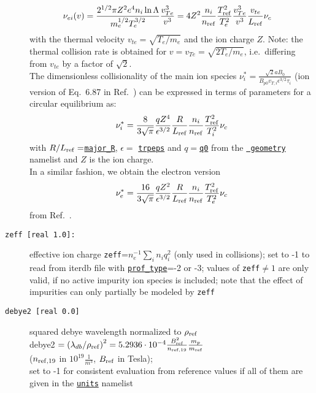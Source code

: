 \documentclass[12pt]{article}
\begin{document}
\begin{description}
\begin{align*}
 \nu_{ei}(v)
 &=\frac{2^{1/2}\pi
 Z^2e^4n_i\ln\Lambda}{m_e^{1/2}T_e^{3/2}}\frac{v_{Te}^3}{v^3}
 =4Z^2\frac{n_i}{n_{{\rm ref}}}\frac{T^2_{{\rm ref}}}{T^2_e}\frac{v_{Te}^3}{v^3}\frac{v_{te}}{L_{{\rm ref}}}\nu_c
\end{align*}
with the thermal velocity $v_{te}=\sqrt{T_e/m_e}$ and the ion charge $Z$. Note: the thermal collision rate is obtained for
$v=v_{Te}=\sqrt{2T_e/m_e}$, i.e.~differing from $v_{te}$ by a factor of $\sqrt{2}$.\\
The dimensionless collisionality of the main ion species $\nu^*_i = \frac{\sqrt{2} a B_0}{B_{p0} v_{T,i} \epsilon^{3/2} \tau_i}$ (ion version of
Eq.~6.87 in Ref.~\cite{HintonHazeltine1976}) can be expressed in terms of \gene parameters for a circular equilibrium as:
\begin{align*}
\nu^*_i = \frac{8}{3\sqrt{\pi}} \frac{q
Z^4}{\epsilon^{3/2}}\frac{R}{L_{{\rm ref}}}\frac{n_i}{n_{{\rm ref}}}\frac{T_{{\rm ref}}^2}{T^2_i}   \nu_c
\end{align*}
with $R/L_{{\rm ref}} = $\hyperlink{major_R}{\tt major\_R}, $\epsilon =$
\hyperlink{trpeps}{\tt trpeps} and
$q=$\hyperlink{q0}{\tt q0} from the \hyperlink{geometry_nml}{\tt
geometry} namelist and $Z$ is the ion charge.\\
In a similar fashion, we obtain the electron version
\begin{align*}
\nu^*_e = \frac{16}{3\sqrt{\pi}} \frac{q
Z^2}{\epsilon^{3/2}}\frac{R}{L_{{\rm ref}}}\frac{n_i}{n_{{\rm ref}}}\frac{T_{{\rm ref}}^2}{T^2_e}   \nu_c
\end{align*}
from Ref.~\cite{HintonHazeltine1976}.
\item[\hypertarget{zeff}{\tt zeff [real 1.0]:}] effective ion charge
\texttt{zeff}=$n_e^{-1}\sum_i n_i q_i^2$ (only used in collisions);
set to -1 to read from iterdb file with \hyperlink{prof_type}{\texttt{prof\_type}}=-2 or -3;
values of \texttt{zeff}$\ne 1$ are only valid, if no active impurity ion
species is included; note that the effect of impurities can only
partially be modeled by {\tt zeff}
\item[\texttt{debye2 [real 0.0]}] squared debye wavelength normalized to $\rho_{\rm ref}$\\
 debye2 $=\left(\lambda_{db}/\rho_{\rm ref}\right)^2=5.2936\cdot 10^{-4}\frac{B_{\rm ref}^2}{n_{{\rm ref} ,19}}\frac{m_p}{m_{\rm ref}}$\\
 ($n_{{\rm ref} ,19}$ in $10^{19}\frac{1}{m^3}$, $B_{\rm ref}$ in Tesla);\\
set to -1 for consistent evaluation from reference values if all of them are given
in the \hyperlink{units_nml}{\tt units} namelist
\end{description}
\end{document}
